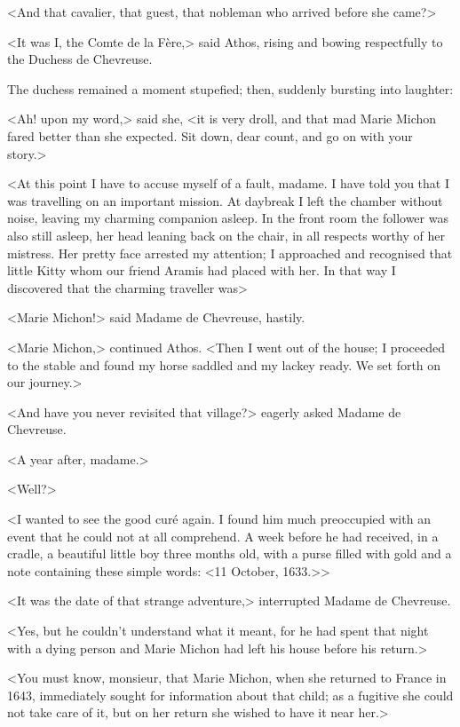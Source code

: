 <And that cavalier, that guest, that nobleman who arrived before she came?>

<It was I, the Comte de la Fère,> said Athos, rising and bowing respectfully to the Duchess de Chevreuse.

The duchess remained a moment stupefied; then, suddenly bursting into laughter:

<Ah! upon my word,> said she, <it is very droll, and that mad Marie Michon fared better than she expected. Sit down, dear count, and go on with your story.>

<At this point I have to accuse myself of a fault, madame. I have told you that I was travelling on an important mission. At daybreak I left the chamber without noise, leaving my charming companion asleep. In the front room the follower was also still asleep, her head leaning back on the chair, in all respects worthy of her mistress. Her pretty face arrested my attention; I approached and recognised that little Kitty whom our friend Aramis had placed with her. In that way I discovered that the charming traveller was\longdash>

<Marie Michon!> said Madame de Chevreuse, hastily.

<Marie Michon,> continued Athos. <Then I went out of the house; I proceeded to the stable and found my horse saddled and my lackey ready. We set forth on our journey.>

<And have you never revisited that village?> eagerly asked Madame de Chevreuse.

<A year after, madame.>

<Well?>

<I wanted to see the good curé again. I found him much preoccupied with an event that he could not at all comprehend. A week before he had received, in a cradle, a beautiful little boy three months old, with a purse filled with gold and a note containing these simple words: <11 October, 1633.>>

<It was the date of that strange adventure,> interrupted Madame de Chevreuse.

<Yes, but he couldn't understand what it meant, for he had spent that night with a dying person and Marie Michon had left his house before his return.>

<You must know, monsieur, that Marie Michon, when she returned to France in 1643, immediately sought for information about that child; as a fugitive she could not take care of it, but on her return she wished to have it near her.>

